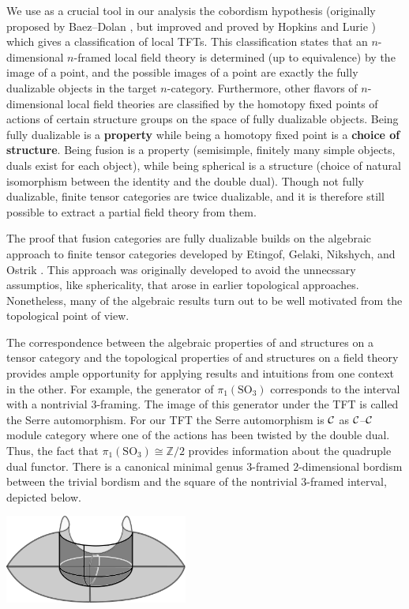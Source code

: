 \documentclass{amsart}
\begin{document}
We use as a crucial tool in our analysis the cobordism hypothesis (originally proposed by Baez--Dolan \cite{MR1355899}, but improved and proved by Hopkins and Lurie \cite{0905.0465}) which gives a classification of local TFTs.  This classification states that an $n$-dimensional $n$-framed local field theory is determined (up to equivalence) by the image of a point, and the possible images of a point are exactly the fully dualizable objects in the target $n$-category.  Furthermore, other flavors of $n$-dimensional local field theories are classified by the homotopy fixed points of actions of certain structure groups on the space of fully dualizable objects.  Being fully dualizable is a {\bf property} while being a homotopy fixed point is a {\bf choice of structure}.  Being fusion is a property (semisimple, finitely many simple objects, duals exist for each object), while being spherical is a structure (choice of natural isomorphism between the identity and the double dual).  Though not fully dualizable, finite tensor categories are twice dualizable, and it is therefore still possible to extract a partial field theory from them.  

The proof that fusion categories are fully dualizable builds on the algebraic approach to finite tensor categories developed by Etingof, Gelaki, Nikshych, and Ostrik \cite{EGNO, MR2183279, MR2097289}.  This approach was originally developed to avoid the unnecssary assumptios, like sphericality, that arose in earlier topological approaches.  Nonetheless, many of the algebraic results turn out to be well motivated from the topological point of view.

The correspondence between the algebraic properties of and structures on a tensor category and the topological properties of and structures on a field theory provides ample opportunity for applying results and intuitions from one context in the other.  For example, the generator of $\pi_1(\mathrm{SO}_3)$ corresponds to the interval with a nontrivial $3$-framing.  The image of this generator under the TFT is called the Serre automorphism.  For our TFT the Serre automorphism is $\mathcal C$ as $\mathcal C$--$\mathcal C$ module category where one of the actions has been twisted by the double dual.  Thus, the fact that $\pi_1(\mathrm{SO}_3) \cong \mathbb{Z}/2$ provides information about the quadruple dual functor.  There is a canonical minimal genus $3$-framed $2$-dimensional bordism between the trivial bordism and the square of the nontrivial $3$-framed interval, depicted below.

\begin{center}
\includegraphics[width=60mm]{cobordism.png}
\end{center}
\end{document}
